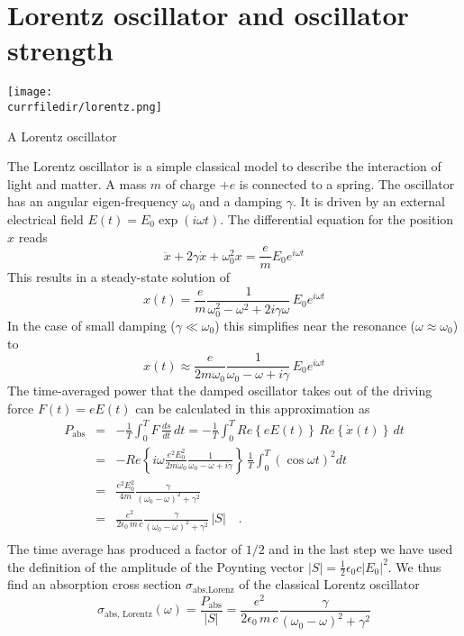 \section{Lorentz oscillator and oscillator strength}


\begin{marginfigure}
\texttt{[image: \\currfiledir/lorentz.png]}
\caption{A Lorentz oscillator}
\end{marginfigure}


The Lorentz oscillator is a simple classical model to describe the interaction of light and matter. A mass $m$ of charge $+e$ is connected to a spring. The oscillator has an angular eigen-frequency $\omega_0$ and a damping $\gamma$. It is driven by an external electrical field $E(t) = E_0 \exp(i \omega t)$. The differential equation for the position $x$ reads
\[
  \ddot{x} + 2  \gamma  \dot{x} + \omega_0^2 x =  \frac{e}{m} E_0 e^{i \omega t}
\]
This results in a steady-state solution of 
\[
  x(t) = \frac{e}{m}  \frac{1}{\omega_0^2 - \omega^2 +2  i \gamma \omega } \, E_0 e^{i \omega t} 
\]
In the case of small damping ($\gamma \ll \omega_0$) this simplifies near the resonance ($\omega \approx \omega_0$) to
\[
  x(t) \approx \frac{e}{2 m \omega_0}  \frac{1}{\omega_0 - \omega + i \gamma } \, E_0 e^{i \omega t} 
\]
The time-averaged power  that the damped oscillator takes out of the driving force $F(t) = e E(t)$ can be calculated in this approximation as
%
\begin{eqnarray*}
 P_{\text{abs}} &= &  - \frac{1}{T} \int_0^T F \, \frac{ds}{dt} \, dt =  
  - \frac{1}{T}  \int_0^T Re \left\{  e E(t) \right\}  \, Re \left\{ \dot{x}(t) \right\} \, dt \\
  & = & - Re \left\{i \omega  \frac{e^2  E_0^2 }{2 m \omega_0}  \frac{1}{\omega_0 - \omega +  i \gamma } \right\}  \,   \frac{1}{T}  \int_0^T \left( \cos \omega t \right)^2 dt \\
%
& = & \frac{e^2 E_0^2  }{4 m }  \frac{\gamma }{(\omega_0 - \omega)^2 +  \gamma ^2}  \\
&  = &  \frac{e^2  }{2 \epsilon_0 \, m \,c }  \frac{\gamma }{(\omega_0 - \omega)^2 +  \gamma ^2}  \, |S|  \quad .\\
\end{eqnarray*}
%
The time average has produced a factor of $1/2$ and in the last step we have used the definition of the amplitude of the Poynting vector $|S| = \frac{1}{2} \epsilon_0 c |E_0|^2$. 
We thus find an absorption cross section $\sigma_{\text{abs,Lorenz}}$ of the classical Lorentz oscillator
\[
 \sigma_{\text{abs, Lorentz}}(\omega) = \frac{ P_{\text{abs}} }{|S| } = \frac{e^2  }{2 \epsilon_0 \,  m \, c}  \frac{\gamma }{(\omega_0 - \omega)^2 +  \gamma ^2} 
\]

